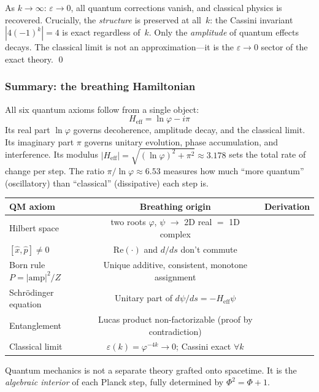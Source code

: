 \documentclass[12pt,a4paper]{article}
\begin{document}
As $k \to \infty$: $\varepsilon \to 0$, all quantum corrections vanish, and classical physics is recovered. Crucially, the \emph{structure} is preserved at all~$k$: the Cassini invariant $|4(-1)^k| = 4$ is exact regardless of~$k$. Only the \emph{amplitude} of quantum effects decays. The classical limit is not an approximation---it is the $\varepsilon \to 0$ sector of the exact theory. \qed

\subsubsection{Summary: the breathing Hamiltonian}

All six quantum axioms follow from a single object:
\begin{equation}
\boxed{H_{\mathrm{eff}} = \ln\varphi - i\pi}
\end{equation}
Its real part $\ln\varphi$ governs decoherence, amplitude decay, and the classical limit. Its imaginary part $\pi$ governs unitary evolution, phase accumulation, and interference. Its modulus $|H_{\mathrm{eff}}| = \sqrt{(\ln\varphi)^2 + \pi^2} \approx 3.178$ sets the total rate of change per step. The ratio $\pi / \ln\varphi \approx 6.53$ measures how much ``more quantum'' (oscillatory) than ``classical'' (dissipative) each step is.

\begin{center}
\small
\begin{tabular}{|l|c|l|}
\hline
\textbf{QM axiom} & \textbf{Breathing origin} & \textbf{Derivation} \\
\hline
Hilbert space & two roots $\varphi$, $\psi$ $\to$ 2D real $= $ 1D complex \\
$[\hat{x}, \hat{p}] \neq 0$ & $\mathrm{Re}(\cdot)$ and $d/ds$ don't commute \\
Born rule $P = |\mathrm{amp}|^2/Z$ & Unique additive, consistent, monotone assignment \\
Schr\"odinger equation & Unitary part of $d\psi/ds = -H_{\mathrm{eff}}\psi$ \\
Entanglement & Lucas product non-factorizable (proof by contradiction) \\
Classical limit & $\varepsilon(k) = \varphi^{-4k} \to 0$; Cassini exact $\forall k$ \\
\hline
\end{tabular}
\end{center}

\noindent Quantum mechanics is not a separate theory grafted onto spacetime. It is the \emph{algebraic interior} of each Planck step, fully determined by $\Phi^2 = \Phi + 1$.
\end{document}

